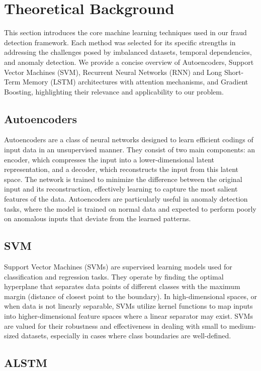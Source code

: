 \section{Theoretical Background}
This section introduces the core machine learning techniques used in our fraud detection framework. Each method was selected for its specific strengths in addressing the challenges posed by imbalanced datasets, temporal dependencies, and anomaly detection. We provide a concise overview of Autoencoders, Support Vector Machines (SVM), Recurrent Neural Networks (RNN) and Long Short-Term Memory (LSTM) architectures with attention mechanisms, and Gradient Boosting, highlighting their relevance and applicability to our problem.

\subsection{Autoencoders}
Autoencoders\cite{Rumelhart1986LearningRB} are a class of neural networks designed to learn efficient codings of input data in an unsupervised manner. They consist of two main components: an encoder, which compresses the input into a lower-dimensional latent representation, and a decoder, which reconstructs the input from this latent space. The network is trained to minimize the difference between the original input and its reconstruction, effectively learning to capture the most salient features of the data. Autoencoders are particularly useful in anomaly detection tasks, where the model is trained on normal data and expected to perform poorly on anomalous inputs that deviate from the learned patterns.

\subsection{SVM}
Support Vector Machines (SVMs)\cite{10.1023/A:1022627411411} are supervised learning models used for classification and regression tasks. They operate by finding the optimal hyperplane that separates data points of different classes with the maximum margin (distance of closest point to the boundary). In high-dimensional spaces, or when data is not linearly separable, SVMs utilize kernel functions to map inputs into higher-dimensional feature spaces where a linear separator may exist. SVMs are valued for their robustness and effectiveness in dealing with small to medium-sized datasets, especially in cases where class boundaries are well-defined.

\subsection{ALSTM}

